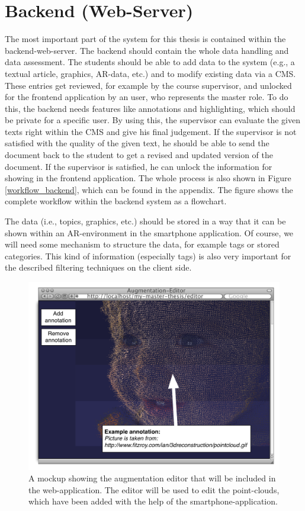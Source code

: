 \section{Backend (Web-Server)}
The most important part of the system for this thesis is contained within the backend-web-server. The backend should contain the whole data handling and data assessment. The students should be able to add data to the system (e.g., a textual article, graphics, \ac{AR}-data, etc.) and to modify existing data via a \ac{CMS}. These entries get reviewed, for example by the course supervisor, and unlocked for the frontend application by an user, who represents the master role. To do this, the backend needs features like annotations and highlighting, which should be private for a specific user. By using this, the supervisor can evaluate the given texts right within the \ac{CMS} and give his final judgement. If the supervisor is not satisfied with the quality of the given text, he should be able to send the document back to the student to get a revised and updated version of the document. If the supervisor is satisfied, he can unlock the information for showing in the frontend application. The whole process is also shown in Figure \ref{workflow_backend}, which can be found in the appendix. The figure shows the complete workflow within the backend system as a flowchart.

The data (i.e., topics, graphics, etc.) should be stored in a way that it can be shown within an \ac{AR}-environment in the smartphone application. Of course, we will need some mechanism to structure the data, for example tags or stored categories. This kind of information (especially tags) is also very important for the described filtering techniques on the client side.

\begin{figure}[ht]
\centerline{\includegraphics[width=1\textwidth]{gfx/mockup_web_1}}
\caption{A mockup showing the augmentation editor that will be included in the web-application. The editor will be used to edit the point-clouds, which have been added with the help of the smartphone-application.}
\label{augmentation_web}
\end{figure}


